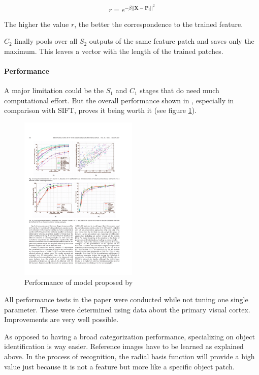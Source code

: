 			\[ r = e^{-\beta \vert\vert \textbf{X} - \textbf{P}_i \vert\vert^2 } \]
			
			The higher the value $ r $, the better the correspondence to the trained feature.
			
			$C_2$ finally pools over all $S_2$ outputs of the same feature patch and saves only the maximum. This leaves a vector with the length of the trained patches.
			
			\paragraph{Performance} A major limitation could be the $S_1$ and $C_1$ stages that do need much computational effort. But the overall performance shown in , especially in comparison with SIFT, proves it being worth it (see figure \ref{serre-performance}).
			
			\begin{figure}[H]
				\centering
				\captionsetup{justification=centering,margin=1cm}
				\includegraphics[width=0.5\textwidth, trim=1.8cm 20cm 12cm 4cm, clip]{images/serre-appearance-based-model3.pdf}
				\caption{Performance of model proposed by \citep{serre2007robust}}
				\label{serre-performance}
			\end{figure}
			
			All performance tests in the paper were conducted while not tuning one single parameter. These were determined using data about the primary visual cortex. Improvements are very well possible.
			
			As opposed to having a broad categorization performance, specializing on object identification is way easier. Reference images have to be learned as explained above. In the process of recognition, the radial basis function will provide a high value just because it is not a feature but more like a specific object patch.

